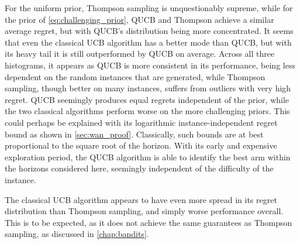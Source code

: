 For the uniform prior, Thompson sampling is unquestionably supreme, while for the prior of \cref{eq:challenging_prior}, QUCB and Thompson achieve a similar average regret, but with QUCB's distribution being more concentrated.
It seems that even the classical UCB algorithm has a better mode than QUCB, but with its heavy tail it is still outperformed by QUCB on average.
Across all three histograms, it appears as QUCB is more consistent in its performance, being less dependent on the random instances that are generated, while Thompson sampling, though better on many instances, suffers from outliers with very high regret.
QUCB seemingly produces equal regrets independent of the prior, while the two classical algorithms perform worse on the more challenging priors.
This could perhaps be explained with its logarithmic instance-independent regret bound as shown in \cref{sec:wan_proof}.
Classically, such bounds are at best proportional to the square root of the horizon.
With its early and expensive exploration period, the QUCB algorithm is able to identify the best arm within the horizons considered here, seemingly independent of the difficulty of the instance.

The classical UCB algorithm appears to have even more spread in its regret distribution than Thompson sampling, and simply worse performance overall.
This is to be expected, as it does not achieve the same guarantees as Thompson sampling, as discussed in \cref{chap:bandits}.



